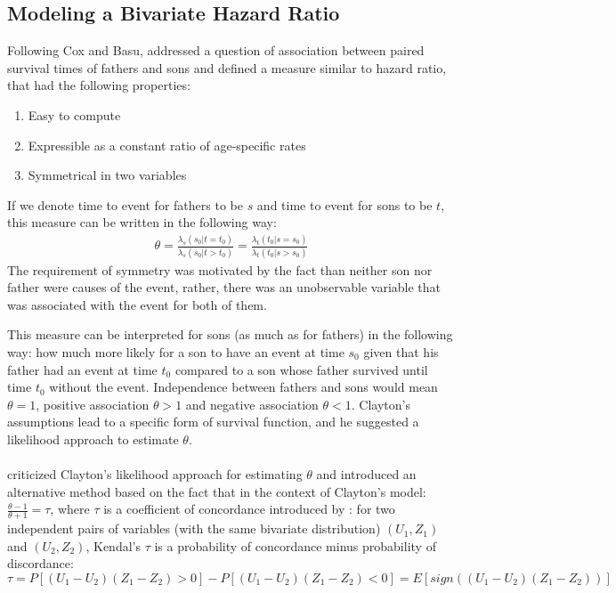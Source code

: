 \documentclass[]{article}
\begin{document}
\subsection{Modeling a Bivariate Hazard Ratio}

Following Cox and Basu, \cite{clayton1978model} addressed a question of association between paired survival times of fathers and sons and defined a measure similar to hazard ratio, that had the following properties:
\begin{enumerate}
	\item Easy to compute
	\item Expressible as a constant ratio of age-specific rates
  \item Symmetrical in two variables
\end{enumerate}
If we denote time to event for fathers to be $s$ and time to event for sons to be $t$, this measure can be written in the following way:
$$
\begin{aligned}
	\theta = \frac{\lambda_s(s_0|t=t_0)}{\lambda_s(s_0|t>t_0)} = \frac{\lambda_t(t_0|s=s_0)}{\lambda_t(t_0|s>s_0)}
\end{aligned}
$$
The requirement of symmetry was motivated by the fact than neither son nor father were causes of the event, rather, there was an unobservable variable that was associated with the event for both of them.

This measure can be interpreted for sons (as much as for fathers) in the following way: how much more likely for a son to have an event at time $s_0$ given that his father had an event at time $t_0$ compared to a son whose father survived until time $t_0$ without the event. Independence between fathers and sons would mean $\theta = 1$, positive association $\theta > 1$ and negative association $\theta < 1$.
Clayton's assumptions lead to a specific form of survival function, and he suggested a likelihood approach to estimate $\theta$.\\
~\\
\cite{oakes1982model} criticized Clayton's likelihood approach for estimating $\theta$ and introduced an alternative method based on the fact that in the context of Clayton's model: $\frac{\theta - 1}{\theta + 1} = \tau$, where $\tau$ is a coefficient of concordance introduced by  \cite{kendall1938new}: for two independent pairs of variables (with the same bivariate distribution) $(U_1, Z_1)$ and $(U_2, Z_2)$, Kendal's $\tau$ is a probability of concordance minus probability of discordance:
$\tau = P[(U_1 - U_2)(Z_1 - Z_2)>0] - P[(U_1 - U_2)(Z_1 - Z_2)<0] = E[sign((U_1 - U_2)(Z_1 - Z_2))]$\\
\end{document}
